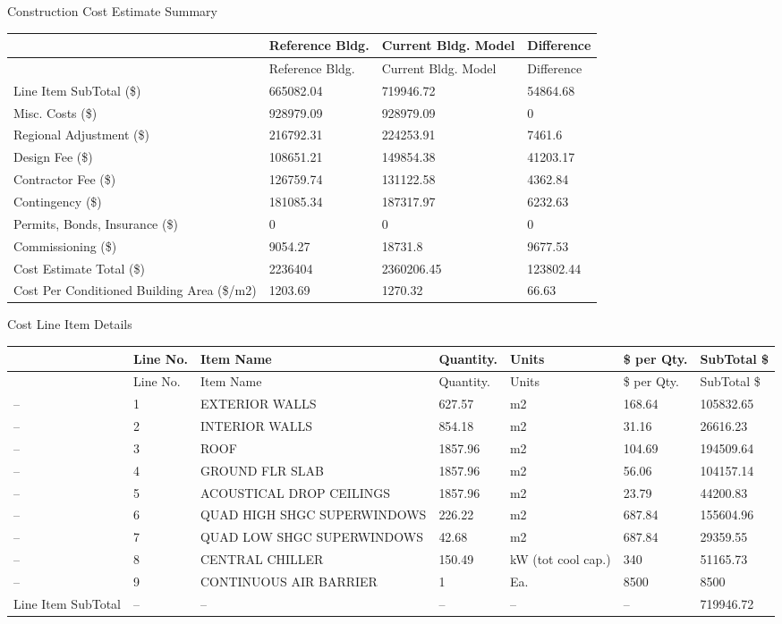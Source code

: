 Construction Cost Estimate Summary

\begin{longtable}[c]{>{\raggedright}p{1.5in}>{\raggedright}p{1.5in}>{\raggedright}p{1.5in}>{\raggedright}p{1.5in}}
\toprule
 & Reference Bldg. & Current Bldg. Model & Difference \tabularnewline
\midrule
\endfirsthead

\toprule
 & Reference Bldg. & Current Bldg. Model & Difference \tabularnewline
\midrule
\endhead

Line Item SubTotal (\$) & 665082.04 & 719946.72 & 54864.68 \tabularnewline
Misc. Costs (\$) & 928979.09 & 928979.09 & 0 \tabularnewline
Regional Adjustment (\$) & 216792.31 & 224253.91 & 7461.6 \tabularnewline
Design Fee (\$) & 108651.21 & 149854.38 & 41203.17 \tabularnewline
Contractor Fee (\$) & 126759.74 & 131122.58 & 4362.84 \tabularnewline
Contingency (\$) & 181085.34 & 187317.97 & 6232.63 \tabularnewline
Permits, Bonds, Insurance (\$) & 0 & 0 & 0 \tabularnewline
Commissioning (\$) & 9054.27 & 18731.8 & 9677.53 \tabularnewline
Cost Estimate Total (\$) & 2236404 & 2360206.45 & 123802.44 \tabularnewline
Cost Per Conditioned Building Area (\$/m2) & 1203.69 & 1270.32 & 66.63 \tabularnewline
\bottomrule
\end{longtable}

Cost Line Item Details

\begin{longtable}[c]{>{\raggedright}p{0.85in}>{\raggedright}p{0.85in}>{\raggedright}p{0.85in}>{\raggedright}p{0.85in}>{\raggedright}p{0.85in}>{\raggedright}p{0.85in}>{\raggedright}p{0.85in}}
\toprule
 & Line No. & Item Name & Quantity. & Units & \$ per Qty. & SubTotal \$ \tabularnewline
\midrule
\endfirsthead

\toprule
 & Line No. & Item Name & Quantity. & Units & \$ per Qty. & SubTotal \$ \tabularnewline
\midrule
\endhead

-- & 1 & EXTERIOR WALLS & 627.57 & m2 & 168.64 & 105832.65 \tabularnewline
-- & 2 & INTERIOR WALLS & 854.18 & m2 & 31.16 & 26616.23 \tabularnewline
-- & 3 & ROOF & 1857.96 & m2 & 104.69 & 194509.64 \tabularnewline
-- & 4 & GROUND FLR SLAB & 1857.96 & m2 & 56.06 & 104157.14 \tabularnewline
-- & 5 & ACOUSTICAL DROP CEILINGS & 1857.96 & m2 & 23.79 & 44200.83 \tabularnewline
-- & 6 & QUAD HIGH SHGC SUPERWINDOWS & 226.22 & m2 & 687.84 & 155604.96 \tabularnewline
-- & 7 & QUAD LOW SHGC SUPERWINDOWS & 42.68 & m2 & 687.84 & 29359.55 \tabularnewline
-- & 8 & CENTRAL CHILLER & 150.49 & kW (tot cool cap.) & 340 & 51165.73 \tabularnewline
-- & 9 & CONTINUOUS AIR BARRIER & 1 & Ea. & 8500 & 8500 \tabularnewline
Line Item SubTotal & -- & -- & -- & -- & -- & 719946.72 \tabularnewline
\bottomrule
\end{longtable}

